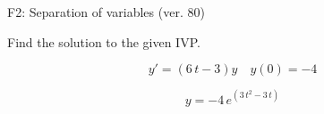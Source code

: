 \begin{exercise}
  \begin{exerciseTitle}F2: Separation of variables (ver. 80)\end{exerciseTitle}
  \begin{exerciseStatement}
    
Find the solution to the given IVP.

    
\[y'=( 6 \, t - 3 )y\hspace{1em} y(0)= -4\]

  \end{exerciseStatement}
  \begin{exerciseAnswer}
    
\[y= -4 \, e^{\left(3 \, t^{2} - 3 \, t\right)}\]

  \end{exerciseAnswer}
\end{exercise}